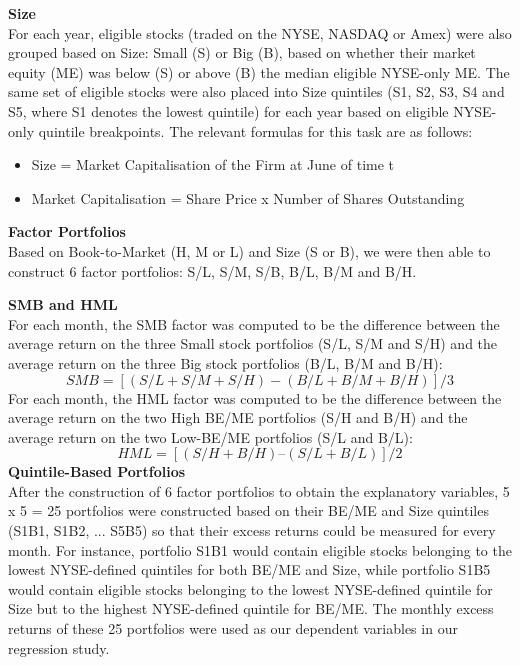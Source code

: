 \documentclass[12pt]{article}
\begin{document}
\noindent \textbf{Size}\\
\noindent For each year, eligible stocks (traded on the NYSE, NASDAQ or Amex) were also grouped based on Size: Small (S) or Big (B), based on whether their market equity (ME) was below (S) or above (B) the median eligible NYSE-only ME. The same set of eligible stocks were also placed into Size quintiles (S1, S2, S3, S4 and S5, where S1 denotes the lowest quintile) for each year based on eligible NYSE-only quintile breakpoints. The relevant formulas for this task are as follows:

\begin{itemize}
\item{Size = Market Capitalisation of the Firm at June of time t}
\item{Market Capitalisation = Share Price x Number of Shares Outstanding}
\end{itemize}

\noindent\textbf{Factor Portfolios}\\
\noindent Based on Book-to-Market (H, M or L) and Size (S or B), we were then able to construct 6 factor portfolios: S/L, S/M, S/B, B/L, B/M and B/H.\\

\newpage

\noindent\textbf{SMB and HML}\\
\noindent For each month, the SMB factor was computed to be the difference between the average return on the three Small stock portfolios (S/L, S/M and S/H) and the average return on the three Big stock portfolios (B/L, B/M and B/H):
$$
SMB=[(S/L+S/M+S/H)-(B/L+B/M+B/H)]/3
$$
For each month, the HML factor was computed to be the difference between the average return on the two High BE/ME portfolios (S/H and B/H) and the average return on the two Low-BE/ME portfolios (S/L and B/L):
$$
HML = [(S/H+B/H)–(S/L+B/L)]/2
$$
\noindent \textbf{Quintile-Based Portfolios}\\
After the construction of 6 factor portfolios to obtain the explanatory variables, 5 x 5 = 25 portfolios were constructed based on their BE/ME and Size quintiles (S1B1, S1B2, ... S5B5) so that their excess returns could be measured for every month. For instance, portfolio S1B1 would contain eligible stocks belonging to the lowest NYSE-defined quintiles for both BE/ME and Size, while portfolio S1B5 would contain eligible stocks belonging to the lowest NYSE-defined quintile for Size but to the highest NYSE-defined quintile for BE/ME. The monthly excess returns of these 25 portfolios were used as our dependent variables in our regression study.\\ 
\end{document}
